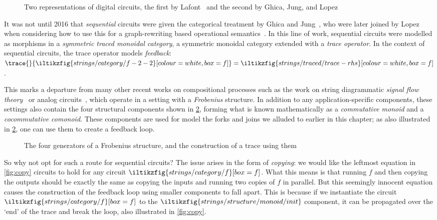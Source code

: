 \begin{figure}
    \centering
    \qquad
    \caption{
        Two representations of digital circuits, the first by
        Lafont~\cite{lafont2003algebraic} and the second by Ghica, Jung, and
        Lopez~\cite{ghica2016categorical,ghica2017diagrammatic}
    }
    \label{fig:history}
\end{figure}

It was not until 2016 that \emph{sequential} circuits were given the
categorical treatment by Ghica and Jung~\cite{ghica2016categorical}, who were
later joined by Lopez when considering how to use this for a graph-rewriting
based operational semantics~\cite{ghica2017diagrammatic}.
In this line of work, sequential circuits were modelled as morphisms in a
\emph{symmetric traced monoidal category}, a symmetric monoidal category
extended with a \emph{trace operator}.
In the context of sequential circuits, the trace operator models
\emph{feedback}: \(
\trace{}{
    \iltikzfig{strings/category/f-2-2}[colour=white,box=f]
}
=
\iltikzfig{strings/traced/trace-rhs}[colour=white,box=f]
\).

This marks a departure from many other recent works on compositional processes
such as the work on string diagrammatic
\emph{signal flow theory}~\cite{bonchi2021survey} or analog
circuits~\cite{boisseau2022string}, which operate in a setting with a
\emph{Frobenius} structure.
In addition to any application-specific components, these settings also contain
the four structural components shown in \cref{fig:frob}, forming what is known
mathematically as a \emph{commutative monoid} and a
\emph{cocommutative comonoid}.
These components are used for model the forks and joins we alluded to earlier in
this chapter; as also illustrated in \cref{fig:frob}, one can use them to create
a feedback loop.

\begin{figure}
    \centering
    \quad
    \quad
    \quad
    \qquad
    \caption{
        The four generators of a Frobenius structure, and the construction of
        a trace using them
    }
    \label{fig:frob}
\end{figure}

So why not opt for such a route for sequential circuits?
The issue arises in the form of \emph{copying}: we would like the leftmost
equation in \cref{fig:copy} circuits to hold for any circuit \(
\iltikzfig{strings/category/f}[box=f]
\).
What this means is that running \(f\) and then copying the outputs
should be exactly the same as copying the inputs and running two copies of
\(f\) in parallel.
But this seemingly innocent equation causes the construction of the feedback
loop using smaller components to fall apart.
This is because if we instantiate the circuit \(
\iltikzfig{strings/category/f}[box=f]
\) to the \(
\iltikzfig{strings/structure/monoid/init}
\) component, it can be propagated over the `end' of the trace and break the
loop, also illustrated in \cref{fig:copy}.

